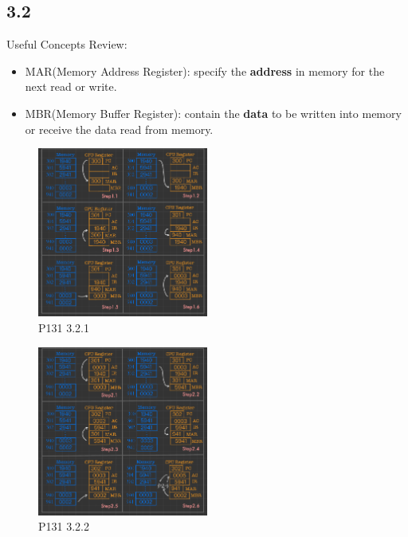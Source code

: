 \documentclass[11pt]{article}  %
\begin{document}
\subsection*{3.2}

Useful Concepts Review: 
\begin{itemize}
    \item MAR(Memory Address Register): specify the \textbf{address} in memory for the next read or write.
    \item MBR(Memory Buffer Register): contain the \textbf{data} to be written into memory or receive the data read from memory.
\end{itemize}

\begin{figure}[H]
    \centering
    \includegraphics[width=0.5\textwidth]{pic/p2/p2-1.pdf}
    \caption{P131 3.2.1}
\end{figure}

\begin{figure}[H]
    \centering
    \includegraphics[width=0.5\textwidth]{pic/p2/p2-2.pdf}
    \caption{P131 3.2.2}
\end{figure}
\end{document}
